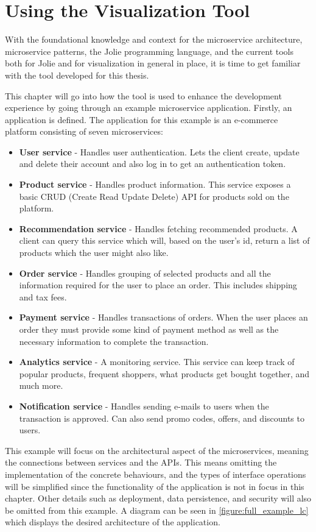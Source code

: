 \chapter{Using the Visualization Tool}
With the foundational knowledge and context for the microservice architecture, microservice patterns, the Jolie programming language, and the current tools both for Jolie and for visualization in general in place, it is time to get familiar with the tool developed for this thesis.

This chapter will go into how the tool is used to enhance the development experience by going through an example microservice application.
Firstly, an application is defined. The application for this example is an e-commerce platform consisting of seven microservices:

\begin{itemize}
    \item \textbf{User service} - Handles user authentication. Lets the client create, update and delete their account and also log in to get an authentication token.
    \item \textbf{Product service} - Handles product information. This service exposes a basic CRUD (Create Read Update Delete) API for products sold on the platform.
    \item \textbf{Recommendation service} - Handles fetching recommended products. A client can query this service which will, based on the user's id, return a list of products which the user might also like.
    \item \textbf{Order service} - Handles grouping of selected products and all the information required for the user to place an order. This includes shipping and tax fees.
    \item \textbf{Payment service} - Handles transactions of orders. When the user places an order they must provide some kind of payment method as well as the necessary information to complete the transaction.
    \item \textbf{Analytics service} - A monitoring service. This service can keep track of popular products, frequent shoppers, what products get bought together, and much more.
    \item \textbf{Notification service} - Handles sending e-mails to users when the transaction is approved. Can also send promo codes, offers, and discounts to users.
\end{itemize}
This example will focus on the architectural aspect of the microservices, meaning the connections between services and the APIs.
This means omitting the implementation of the concrete behaviours, and the types of interface operations will be simplified since the functionality of the application is not in focus in this chapter.
Other details such as deployment, data persistence, and security will also be omitted from this example. A diagram can be seen in \cref{figure:full_example_lc} which displays the desired architecture of the application.

